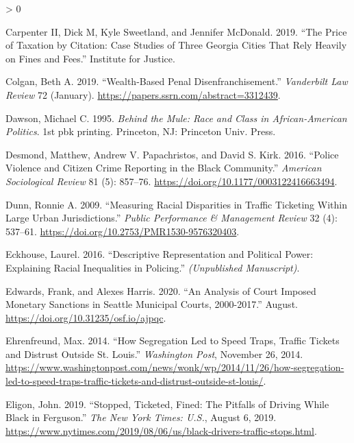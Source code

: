 \documentclass[
  12pt,
]{article}
\newlength{\cslhangindent}
\newenvironment{CSLReferences}[2] %
 {%
  \setlength{\parindent}{0pt}
  \ifodd #1 \everypar{\setlength{\hangindent}{\cslhangindent}}\ignorespaces\fi
  \ifnum #2 > 0
  \setlength{\parskip}{#2\baselineskip}
  \fi
 }%
 {}
\begin{document}
\begin{CSLReferences}{1}{0}
\leavevmode\hypertarget{ref-CarpenterII2019}{}%
Carpenter II, Dick M, Kyle Sweetland, and Jennifer McDonald. 2019. {``The {Price} of {Taxation} by {Citation}: {Case Studies} of {Three Georgia Cities That Rely Heavily} on {Fines} and {Fees}.''} {Institute for Justice}.

\leavevmode\hypertarget{ref-Colgan2019}{}%
Colgan, Beth A. 2019. {``Wealth-{Based Penal Disenfranchisement}.''} \emph{Vanderbilt Law Review} 72 (January). \url{https://papers.ssrn.com/abstract=3312439}.

\leavevmode\hypertarget{ref-Dawson1995}{}%
Dawson, Michael C. 1995. \emph{Behind the Mule: Race and Class in {African}-{American} Politics}. 1st pbk printing. {Princeton, NJ}: {Princeton Univ. Press}.

\leavevmode\hypertarget{ref-Desmond2016}{}%
Desmond, Matthew, Andrew V. Papachristos, and David S. Kirk. 2016. {``Police {Violence} and {Citizen Crime Reporting} in the {Black Community}.''} \emph{American Sociological Review} 81 (5): 857--76. \url{https://doi.org/10.1177/0003122416663494}.

\leavevmode\hypertarget{ref-Dunn2009}{}%
Dunn, Ronnie A. 2009. {``Measuring {Racial Disparities} in {Traffic Ticketing Within Large Urban Jurisdictions}.''} \emph{Public Performance \& Management Review} 32 (4): 537--61. \url{https://doi.org/10.2753/PMR1530-9576320403}.

\leavevmode\hypertarget{ref-Eckhouse2016}{}%
Eckhouse, Laurel. 2016. {``Descriptive {Representation} and {Political Power}: {Explaining Racial Inequalities} in {Policing}.''} \emph{(Unpublished Manuscript)}.

\leavevmode\hypertarget{ref-Edwards2020}{}%
Edwards, Frank, and Alexes Harris. 2020. {``An {Analysis} of {Court Imposed Monetary Sanctions} in {Seattle Municipal Courts}, 2000-2017.''} August. \url{https://doi.org/10.31235/osf.io/ajpqc}.

\leavevmode\hypertarget{ref-Ehrenfreund2014}{}%
Ehrenfreund, Max. 2014. {``How Segregation Led to Speed Traps, Traffic Tickets and Distrust Outside {St}. {Louis}.''} \emph{Washington Post}, November 26, 2014. \url{https://www.washingtonpost.com/news/wonk/wp/2014/11/26/how-segregation-led-to-speed-traps-traffic-tickets-and-distrust-outside-st-louis/}.

\leavevmode\hypertarget{ref-Eligon2019}{}%
Eligon, John. 2019. {``Stopped, {Ticketed}, {Fined}: {The Pitfalls} of {Driving While Black} in {Ferguson}.''} \emph{The New York Times: U.S.}, August 6, 2019. \url{https://www.nytimes.com/2019/08/06/us/black-drivers-traffic-stops.html}.


\end{CSLReferences}
\end{document}
